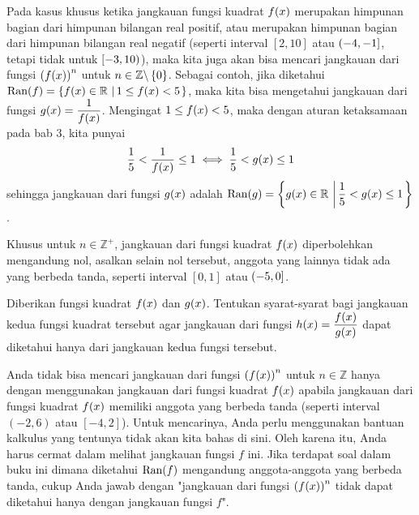 	\par Pada kasus khusus ketika jangkauan fungsi kuadrat $ \mathop{}\!{f}{\left({x}\right)} $ merupakan himpunan bagian dari himpunan bilangan real positif, atau merupakan himpunan bagian dari himpunan bilangan real negatif (seperti interval $ \left[2, 10\right] $ atau $ \mathop{}\!\left({-4, -1}\right] $, tetapi tidak untuk $ \mathop{}\!\left[{-3, 10}\right) $), maka kita juga akan bisa mencari jangkauan dari fungsi $ \left(\mathop{}\!{f}{\left({x}\right)}\right)^{n} $ untuk $ n \in \mathbb{Z} \backslash \mathop{}\!\left\lbrace0\right\rbrace $. Sebagai contoh, jika diketahui $ \mathop{}\!{\operatorname{Ran}}{\left({f}\right)} = \mathop{}\!\left\lbrace{{\mathop{}\!{f}{\left({x}\right)} \in \mathbb{R}} \, \left|\, {1 \leq \mathop{}\!{f}{\left({x}\right)} < 5}\right.}\right\rbrace $, maka kita bisa mengetahui jangkauan dari fungsi $ \mathop{}\!{g}{\left({x}\right)} = \dfrac{1}{\mathop{}\!{f}{\left({x}\right)}} $. Mengingat $ 1 \leq \mathop{}\!{f}{\left({x}\right)} < 5 $, maka dengan aturan ketaksamaan pada bab 3, kita punyai
	\[ \frac{1}{5} < \frac{1}{\mathop{}\!{f}{\left({x}\right)}} \leq 1 \iff \frac{1}{5} < \mathop{}\!{g}{\left({x}\right)} \leq 1 \]
	sehingga jangkauan dari fungsi $ \mathop{}\!{g}{\left({x}\right)} $ adalah $ \mathop{}\!{\operatorname{Ran}}{\left({g}\right)} = \mathop{}\!\left\lbrace{{\mathop{}\!{g}{\left({x}\right)} \in \mathbb{R}} \, \left|\, {\dfrac{1}{5} < \mathop{}\!{g}{\left({x}\right)} \leq 1}\right.}\right\rbrace $.
	
	\par Khusus untuk $ n \in \mathbb{Z}^{+} $, jangkauan dari fungsi kuadrat $ \mathop{}\!{f}{\left({x}\right)} $ diperbolehkan mengandung nol, asalkan selain nol tersebut, anggota yang lainnya tidak ada yang berbeda tanda, seperti interval $ \left[0, 1\right] $ atau $ \mathop{}\!\left({-5, 0}\right] $.
	
	\begin{explbox}
		Diberikan fungsi kuadrat $ \mathop{}\!{f}{\left({x}\right)} $ dan $ \mathop{}\!{g}{\left({x}\right)} $. Tentukan syarat-syarat bagi jangkauan kedua fungsi kuadrat tersebut agar jangkauan dari fungsi $ \mathop{}\!{h}{\left({x}\right)} = \dfrac{\mathop{}\!{f}{\left({x}\right)}}{\mathop{}\!{g}{\left({x}\right)}} $ dapat diketahui hanya dari jangkauan kedua fungsi tersebut.
	\end{explbox}
	
	\par Anda tidak bisa mencari jangkauan dari fungsi $ \left(\mathop{}\!{f}{\left({x}\right)}\right)^{n} $ untuk $ n \in \mathbb{Z} $ hanya dengan menggunakan jangkauan dari fungsi kuadrat $ \mathop{}\!{f}{\left({x}\right)} $ apabila jangkauan dari fungsi kuadrat $ \mathop{}\!{f}{\left({x}\right)} $ memiliki anggota yang berbeda tanda (seperti interval $ \left(-2, 6\right) $ atau $ \left[-4, 2\right] $). Untuk mencarinya, Anda perlu menggunakan bantuan kalkulus yang tentunya tidak akan kita bahas di sini. Oleh karena itu, Anda harus cermat dalam melihat jangkauan fungsi $ f $ ini. Jika terdapat soal dalam buku ini dimana diketahui $ \mathop{}\!{\operatorname{Ran}}{\left({f}\right)} $ mengandung anggota-anggota yang berbeda tanda, cukup Anda jawab dengan "jangkauan dari fungsi $ \left(\mathop{}\!{f}{\left({x}\right)}\right)^{n} $ tidak dapat diketahui hanya dengan jangkauan fungsi $ f $".
	
